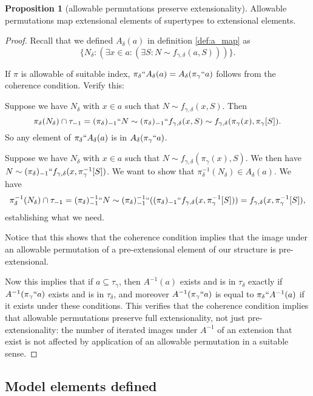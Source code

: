 \documentclass[112pt]{article}
\theoremstyle{definition}
\newtheorem{proposition}[theorem]{Proposition}
\theoremstyle{remark}
\begin{document}
\begin{proposition}[allowable permutations preserve extensionality]\label{prop:allowable_preserves_extensionality}
Allowable permutations map extensional elements of supertypes to extensional elements.
\end{proposition}
\begin{proof}
{Recall that} we defined $A_\delta(a)$ {in definition \ref{def:a_map}} as $$\{N_\delta:(\exists x \in a:(\exists S:N \sim f_{\gamma,\delta}(a,S)))\}.$$

If $\pi$ is allowable of suitable index, $\pi_\delta``A_\delta(a)= A_\delta(\pi_\gamma``a)$ follows from the coherence condition.  Verify this:

Suppose we have $N_\delta$ with $x \in a$ such that $N \sim f_{\gamma,\delta}(x,S)$.  Then $$\pi_\delta(N_\delta)  \cap \tau_{-1} = (\pi_\delta)_{-1}``N \sim (\pi_\delta)_{-1}``f_{\gamma,\delta}(x,S) \sim f_{\gamma,\delta}(\pi_\gamma(x),\pi_\gamma[S]).$$  So any element of $\pi_\delta``A_\delta(a)$ is in $A_\delta(\pi_\gamma``a)$.

Suppose we have $N_\delta$ with $x \in a$ such that $N \sim f_{\gamma,\delta}(\pi_\gamma(x),S)$.  We then have $N \sim (\pi_\delta)_{-1}``f_{\gamma,\delta}(x,\pi_\gamma^{-1}[S])$.  We want to show that $\pi_\delta^{-1}(N_\delta) \in A_\delta(a)$.  We have $$\pi_\delta^{-1}(N_\delta) \cap \tau_{-1} = (\pi_\delta)_{-1}^{-1}``N \sim
(\pi_\delta)_{-1}^{-1}``((\pi_\delta)_{-1}``f_{\gamma,\delta}(x,\pi_\gamma^{-1}[S])) = f_{\gamma,\delta}(x,\pi_\gamma^{-1}[S]),$$ establishing what we need.

Notice that this shows that the coherence condition implies that the image under an allowable permutation of a pre-extensional element of our structure is pre-extensional.

Now this implies that if $a \subseteq \tau_\gamma$, then $A^{-1}(a)$ exists and is in $\tau_\delta$ exactly if $A^{-1}(\pi_\gamma``a)$ exists and is in $\tau_\delta$, and moreover $A^{-1}(\pi_\gamma``a)$ is equal to $\pi_\delta``A^{-1}(a)$ if it exists under these conditions.  This verifies that the coherence condition implies that allowable permutations preserve full extensionality, not just pre-extensionality:  the number of iterated images under $A^{-1}$ of an extension that exist is not affected by application of an allowable permutation in a suitable sense.
\end{proof}

\subsection{Model elements defined}\label{ss:model_elements}
\end{document}
